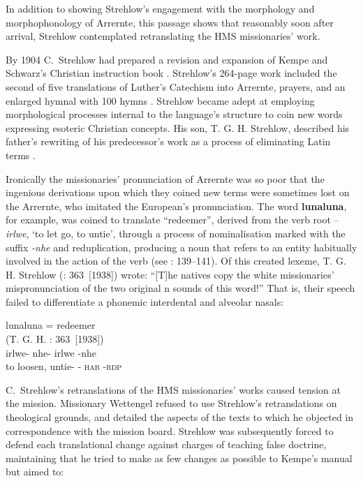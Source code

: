 In addition to showing Strehlow’s engagement with the morphology and morphophonology of Arrernte, this passage shows that reasonably soon after arrival, Strehlow contemplated retranslating the HMS missionaries' work.

By {1904} C.~Strehlow had prepared a revision and expansion of Kempe and Schwarz’s Christian instruction book \citeyearpar{kempe_galtjintana-pepa_1891}. Strehlow’s 264-page work \citeyearpar{strehlow_galtjindinjamea-pape_1904} included the second of five translations of Luther’s Catechism into Arrernte, prayers, and an enlarged hymnal with 100 hymns \citep[104]{graetz_open_1988}. Strehlow became adept at employing morphological processes internal to the language’s structure to coin new words expressing esoteric Christian concepts. His son, T. G. H. Strehlow, described his father’s rewriting of his predecessor’s work as a process of eliminating Latin terms \citeyearpar[42]{strehlow_no_1979}.

Ironically the missionaries' pronunciation of Arrernte was so poor that the ingenious derivations upon which they coined new terms were sometimes lost on the Arrernte, who imitated the European’s pronunciation. The word \textbf{lunaluna}, for example, was coined to translate “redeemer'', derived from the verb root –\textit{irlwe}, `to let go, to untie', through a process of nominalisation marked with the suffix \textit{-nhe} and reduplication, producing a noun that refers to an entity habitually involved in the action of the verb (see \citealt{wilkins_mparntwe_1989}: 139--141). Of this created lexeme, T. G. H. Strehlow (\citeyear{strehlow_aranda_1944}: 363~[1938]) wrote: “[T]he natives copy the white missionaries' mispronunciation of the two original n sounds of this word!” That is, their speech failed to differentiate a phonemic interdental and alveolar nasals:

\ea            lunaluna = redeemer \\
(T. G. H. \citet{strehlow_aranda_1944}: 363~[1938]) \\
\gll             irlwe- nhe- irlwe -nhe\\
           {to loosen, untie}- - \textsc{hab} -\textsc{rdp}\\
\z

C.~Strehlow’s retranslations of the HMS missionaries' works caused tension at the mission. Missionary Wettengel refused to use Strehlow’s retranslations on theological grounds, and detailed the aspects of the texts to which he objected in correspondence with the mission board. Strehlow was subsequently forced to defend each translational change against charges of teaching false doctrine, maintaining that he tried to make as few changes as possible to Kempe’s manual but aimed to:

